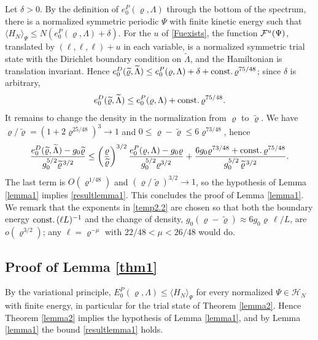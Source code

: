 \documentclass[11pt]{article}
\numberwithin{equation}{section}
\newcommand\const{{\rm const.\, }}
\renewcommand\rho\varrho
\theoremstyle{definition}
\begin{document}
Let $\delta>0$. By the definition of $e_0^P(\rho,\Lambda)$ through the bottom of the spectrum, there is a normalized symmetric periodic $\Psi$ with finite kinetic energy such that
$\langle H_N\rangle_\Psi\leq N(e_0^P(\rho,\Lambda)+\delta)$. For the $u$ of \eqref{Fuexists}, the function ${\cal F}^u(\Psi)$, translated by $(\ell,\ell,\ell)+u$ in each variable,
is a normalized symmetric trial state with the Dirichlet boundary condition on $\widetilde\Lambda$, and the Hamiltonian is translation invariant. Hence
$e_0^D(\widetilde\rho,\widetilde\Lambda)\leq e_0^P(\rho,\Lambda)+\delta+\const\rho^{75/48}$; since $\delta$ is arbitrary,
\[
e_0^D(\widetilde\rho,\widetilde\Lambda)\leq e_0^P(\rho,\Lambda)+\const\rho^{75/48}.
\]
It remains to change the density in the normalization from $\rho$ to $\widetilde\rho$. We have $\rho/\widetilde\rho=(1+2\rho^{25/48})^3\to1$ and
$0\leq\rho-\widetilde\rho\leq 6\rho^{73/48}$, hence
\[
\frac{e^D_0(\widetilde \rho,\widetilde\Lambda)-g_0\widetilde \rho }{ g_0^{5/2} \widetilde \rho ^{\,3/2}}\leq
\left(\frac{\rho}{\widetilde\rho}\right)^{3/2}\frac{e^P_0(\rho,\Lambda)-g_0\rho }{ g_0^{5/2} \rho ^{3/2}}
+\frac{6g_0\rho^{73/48}+\const\rho^{75/48}}{g_0^{5/2}\,\widetilde\rho^{\,3/2}} .
\]
The last term is $O(\rho^{1/48})$ and $(\rho/\widetilde\rho)^{3/2}\to 1$, so the hypothesis of Lemma \ref{lemma1} implies \eqref{resultlemma1}.
This concludes the proof of Lemma \ref{lemma1}.
We remark that the exponents in \eqref{temp2.2} are chosen so that both the boundary energy $\const(\ell L)^{-1}$ and the change of density,
$g_0(\rho-\widetilde\rho)\approx 6g_0\rho\,\ell/L$, are $o(\rho^{3/2})$; any $\ell=\rho^{-\mu}$ with $22/48<\mu<26/48$ would do.



\subsection{Proof of Lemma \ref{thm1}}\label{subsec:lemma21}

By the variational principle, $E_0^P(\rho,\Lambda)\leq\langle H_N\rangle_\Psi$ for every normalized $\Psi\in\mathcal H_N$ with finite energy, in particular for the trial state of Theorem \ref{lemma2}.
Hence Theorem \ref{lemma2} implies the hypothesis of Lemma \ref{lemma1}, and by Lemma \ref{lemma1} the bound \eqref{resultlemma1} holds.
\end{document}
